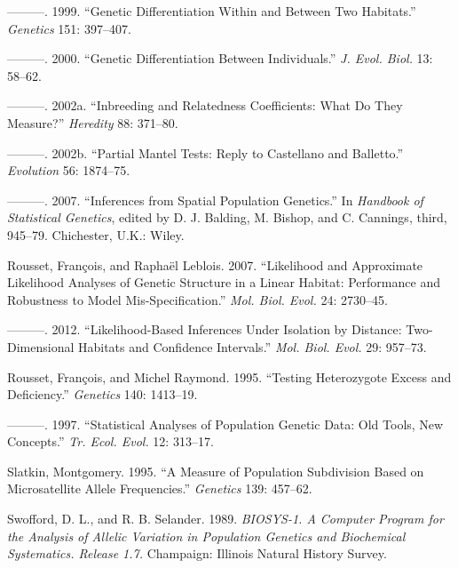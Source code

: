 \documentclass[
  12pt,
]{book}
\newlength{\cslhangindent}
\newlength{\cslentryspacingunit} %
\newenvironment{CSLReferences}[2] %
 {%
  \setlength{\parindent}{0pt}
  \ifodd #1
  \let\oldpar\par
  \def\par{\hangindent=\cslhangindent\oldpar}
  \fi
  \setlength{\parskip}{#2\cslentryspacingunit}
 }%
 {}
\begin{document}
\begin{CSLReferences}{1}{0}
\leavevmode{}%
---------. 1999. {``Genetic Differentiation Within and Between Two Habitats.''} \emph{Genetics} 151: 397--407.

\leavevmode{}%
---------. 2000. {``Genetic Differentiation Between Individuals.''} \emph{J. Evol. Biol.} 13: 58--62.

\leavevmode{}%
---------. 2002a. {``Inbreeding and Relatedness Coefficients: What Do They Measure?''} \emph{Heredity} 88: 371--80.

\leavevmode{}%
---------. 2002b. {``Partial Mantel Tests: Reply to Castellano and Balletto.''} \emph{Evolution} 56: 1874--75.

\leavevmode{}%
---------. 2007. {``Inferences from Spatial Population Genetics.''} In \emph{Handbook of Statistical Genetics}, edited by D. J. Balding, M. Bishop, and C. Cannings, third, 945--79. Chichester, U.K.: Wiley.

\leavevmode{}%
Rousset, François, and Raphaël Leblois. 2007. {``Likelihood and Approximate Likelihood Analyses of Genetic Structure in a Linear Habitat: Performance and Robustness to Model Mis-Specification.''} \emph{Mol. Biol. Evol.} 24: 2730--45.

\leavevmode{}%
---------. 2012. {``Likelihood-Based Inferences Under Isolation by Distance: Two-Dimensional Habitats and Confidence Intervals.''} \emph{Mol. Biol. Evol.} 29: 957--73.

\leavevmode{}%
Rousset, François, and Michel Raymond. 1995. {``Testing Heterozygote Excess and Deficiency.''} \emph{Genetics} 140: 1413--19.

\leavevmode{}%
---------. 1997. {``Statistical Analyses of Population Genetic Data: Old Tools, New Concepts.''} \emph{Tr. Ecol. Evol.} 12: 313--17.

\leavevmode{}%
Slatkin, Montgomery. 1995. {``A Measure of Population Subdivision Based on Microsatellite Allele Frequencies.''} \emph{Genetics} 139: 457--62.

\leavevmode{}%
Swofford, D. L., and R. B. Selander. 1989. \emph{BIOSYS-1. A Computer Program for the Analysis of Allelic Variation in Population Genetics and Biochemical Systematics. Release 1.7.} Champaign: Illinois Natural History Survey.


\end{CSLReferences}
\end{document}
